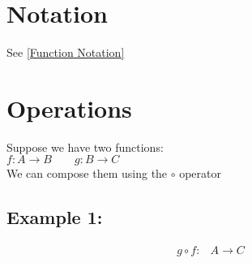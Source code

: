 \documentclass[class=article, crop=false]{standalone}
\begin{document}
\section*{Notation}
See \href{https://github.com/Jex-y/ALevelFurtherMathsNotes/blob/master/output/Pure/FunctionNotation.pdf}{[Function Notation]}\\
\section*{Operations}
Suppose we have two functions:\\ 
$f: A \rightarrow B \qquad g: B \rightarrow C $\\
We can compose them using the $ \circ $ operator\\
\subsection*{Example 1:}
\begin{align*}
g \circ f: & A \rightarrow C \\
\end{align*}
\end{document}
